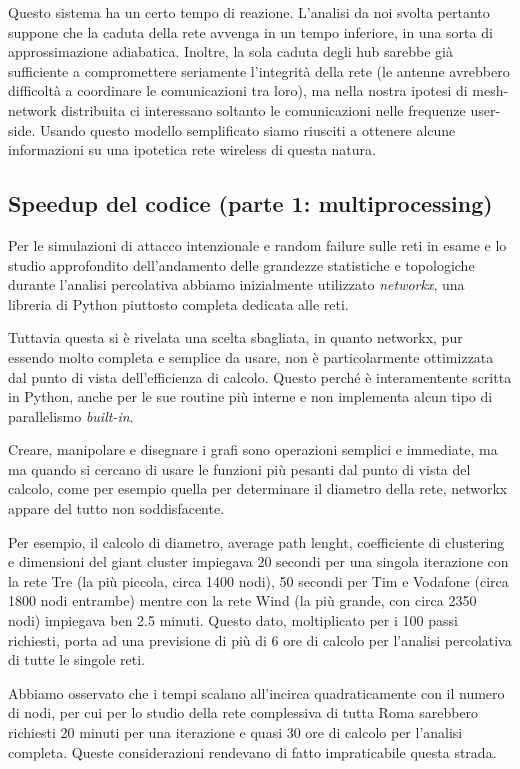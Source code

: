 Questo sistema ha un certo tempo di reazione. L'analisi da noi svolta pertanto suppone che la caduta della rete avvenga in un tempo inferiore, in una sorta di approssimazione adiabatica. Inoltre, la sola caduta degli hub sarebbe già sufficiente a compromettere seriamente l'integrità della rete (le antenne avrebbero difficoltà a coordinare le comunicazioni tra loro), ma nella nostra ipotesi di mesh-network distribuita ci interessano soltanto le comunicazioni nelle frequenze user-side. Usando questo modello semplificato siamo riusciti a ottenere alcune informazioni su una ipotetica rete wireless di questa natura.


\subsection{Speedup del codice (parte 1: multiprocessing)}

Per le simulazioni di attacco intenzionale e random failure sulle reti in esame e lo studio approfondito dell'andamento delle grandezze statistiche e topologiche durante l'analisi percolativa abbiamo inizialmente utilizzato \emph{networkx}, una libreria di Python piuttosto completa dedicata alle reti.

Tuttavia questa si è rivelata una scelta sbagliata, in quanto networkx, pur essendo molto completa e semplice da usare, non è particolarmente ottimizzata dal punto di vista dell'efficienza di calcolo. Questo perché è interamentente scritta in Python, anche per le sue routine più interne e non implementa alcun tipo di parallelismo \emph{built-in}.

Creare, manipolare e disegnare i grafi sono operazioni semplici e immediate, ma ma quando si cercano di usare le funzioni più pesanti dal punto di vista del calcolo, come per esempio quella per determinare il diametro della rete, networkx appare del tutto non soddisfacente.

Per esempio, il calcolo di diametro, average path lenght, coefficiente di clustering e dimensioni del giant cluster impiegava 20 secondi per una singola iterazione con la rete Tre (la più piccola, circa 1400 nodi), 50 secondi per Tim e Vodafone (circa 1800 nodi entrambe) mentre con la rete Wind (la più grande, con circa 2350 nodi) impiegava ben 2.5 minuti. Questo dato, moltiplicato per i 100 passi richiesti, porta ad una previsione di più di 6 ore di calcolo per l'analisi percolativa di tutte le singole reti.

Abbiamo osservato che i tempi scalano all'incirca quadraticamente con il numero di nodi, per cui per lo studio della rete complessiva di tutta Roma sarebbero richiesti 20 minuti per una iterazione e quasi 30 ore di calcolo per l'analisi completa. Queste considerazioni rendevano di fatto impraticabile questa strada.

